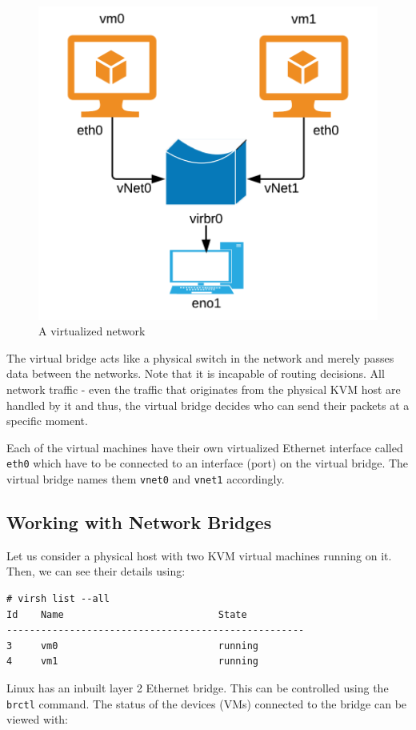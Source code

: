 \begin{figure}[H]
	\centering
	\includegraphics[width=0.5\linewidth]{Mod2/chapters/2.6.b}
	\caption{A virtualized network}
	\label{fig:2}
\end{figure}

\noindent	
The virtual bridge acts like a physical switch in the network and merely passes data between the networks. Note that it is incapable of routing decisions. All network traffic - even the traffic that originates from the physical KVM host are handled by it and thus, the virtual bridge decides who can send their packets at a specific moment. 

Each of the virtual machines have their own virtualized Ethernet interface called \verb|eth0| which have to be connected to an interface (port) on the virtual bridge. The virtual bridge names them \verb|vnet0| and \verb|vnet1| accordingly. 
\vspace{-10pt}

\subsection{Working with Network Bridges} \vspace{-10pt}
Let us consider a physical host with two KVM virtual machines running on it. Then, we can see their details using:

\vspace{-20pt}
\begin{verbatim}
# virsh list --all
Id    Name                           State
----------------------------------------------------
3     vm0                            running
4     vm1                            running
\end{verbatim}
\vspace{-15pt}	

\noindent 
Linux has an inbuilt layer 2 Ethernet bridge. This can be controlled using the \verb|brctl| command. The status of the devices (VMs) connected to the bridge can be viewed with:

